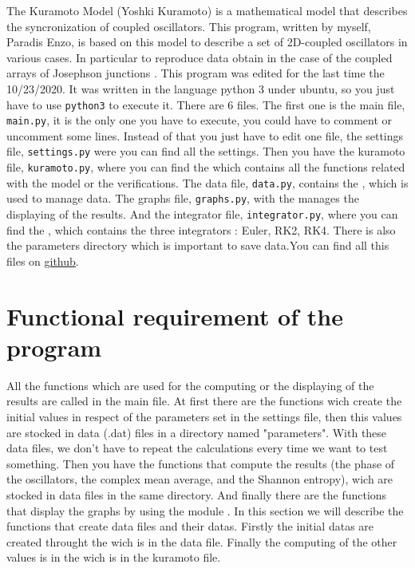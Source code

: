 \documentclass[1pt, a4paper]{article}
\begin{document}
\maketitlepage
\tableofcontents
\newpage
\noindent
The Kuramoto Model (Yoshki Kuramoto) is a mathematical model that describes the syncronization of coupled oscillators. This program, written by myself, Paradis Enzo, is based on this model to describe a set of 2D-coupled oscillators in various cases. In particular to reproduce data obtain in the case of the coupled arrays of Josephson junctions \cite{josephson}. This program was edited for the last time the 10/23/2020. It was written in the language python 3 under ubuntu, so you just have to use \texttt{python3} to execute it. There are 6 files. The first one is the main file, \texttt{main.py}, it is the only one you have to execute, you could have to comment or uncomment some lines. Instead of that you just have to edit one file, the settings file, \texttt{settings.py} were you can find all the settings. Then you have the kuramoto file, \texttt{kuramoto.py}, where you can find the  which contains all the functions related with the model or the verifications. The data file, \texttt{data.py}, contains the , which is used to manage data. The graphs file, \texttt{graphs.py}, with the  manages the displaying of the results. And the integrator file, \texttt{integrator.py}, where you can find the , which contains the three integrators : Euler, RK2, RK4. There is also the parameters directory which is important to save data.You can find all this files on \href{https://github.com/faucheresse/swimming_pool/tree/main/prog}{github}.
\section{Functional requirement of the program}
\label{sec:1}
\noindent
All the functions which are used for the computing or the displaying of the results are called in the main file. At first there are the functions wich create the initial values in respect of the parameters set in the settings file, then this values are stocked in data (.dat) files in a directory named "parameters". With these data files, we don't have to repeat the calculations every time we want to test something. Then you have the functions that compute the results (the phase of the oscillators, the complex mean average, and the Shannon entropy), wich are stocked in data files in the same directory. And finally there are the functions that display the graphs by using the module . In this section we will describe the functions that create data files and their datas. Firstly the initial datas are created throught the  wich is in the data file. Finally the computing of the other values is in the  wich is in the kuramoto file.
\end{document}
